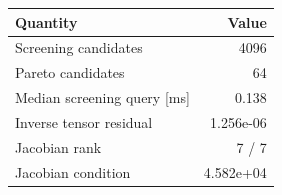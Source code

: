 \begin{tabular}{lr}
\toprule
Quantity & Value \\
\midrule
Screening candidates & 4096 \\ 
Pareto candidates & 64 \\ 
Median screening query [ms] & 0.138 \\ 
Inverse tensor residual & 1.256e-06 \\ 
Jacobian rank & 7 / 7 \\ 
Jacobian condition & 4.582e+04 \\ 
\bottomrule
\end{tabular}
